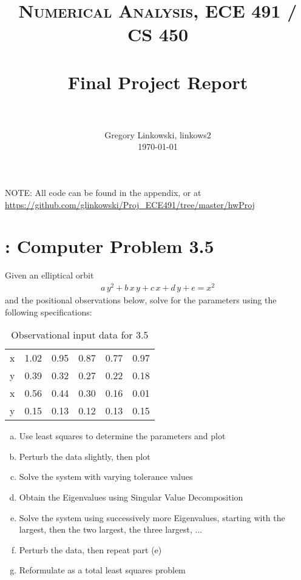 \documentclass[paper=a4, fontsize=11pt]{scrartcl}
\title{
		\usefont{OT1}{bch}{b}{n}
		\normalfont \normalsize \textsc{Numerical Analysis, ECE 491 / CS 450} \\ [25pt]
		\horrule{0.5pt} \\[0.4cm]
		\huge Final Project Report \\
		\horrule{2pt} \\[0.5cm]
}
\author{
		\normalfont 								\normalsize
        Gregory Linkowski, linkows2\\[-3pt]		\normalsize
        \today
}
\date{}
\numberwithin{equation}{section}		%
\numberwithin{figure}{section}			%
\numberwithin{table}{section}				%
\begin{document}
\maketitle

NOTE: All code can be found in the appendix, or at \\ \url{https://github.com/glinkowski/Proj_ECE491/tree/master/hwProj}

\vspace{4mm}
\section{: Computer Problem 3.5}
Given an elliptical orbit
\begin{align*}
	a \, y^2 + b \, x\, y + c\, x + d\, y + e = x^2
\end{align*}
and the positional observations below, solve for the parameters using the following specifications:
\begin{table}[!hbt]
	\begin{center}
		\caption{Observational input data for 3.5}
		\label{tab:35input}
		\begin{tabular}{ c|c c c c c }
			x & 1.02 & 0.95 & 0.87 & 0.77 & 0.97 \\
			y & 0.39 & 0.32 & 0.27 & 0.22 & 0.18 \\
			\hline
			x & 0.56 & 0.44 & 0.30 & 0.16 & 0.01 \\
			y & 0.15 & 0.13 & 0.12 & 0.13 & 0.15 \\
		\end{tabular}
	\end{center}
\end{table}

\begin{enumerate}[(a)]
	\item Use least squares to determine the parameters and plot  \vspace{-2mm}
	\item Perturb the data slightly, then plot \vspace{-2mm}
	\item Solve the system with varying tolerance values \vspace{-2mm}
	\item Obtain the Eigenvalues using Singular Value Decomposition \vspace{-2mm}
	\item Solve the system using successively more Eigenvalues, starting with the largest, then the two largest, the three largest, ... \vspace{-2mm}
	\item Perturb the data, then repeat part (e) \vspace{-2mm}
	\item Reformulate as a total least squares problem \vspace{-2mm}
\end{enumerate}
\end{document}
